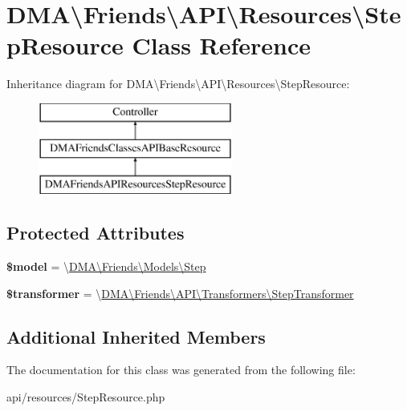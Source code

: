 \hypertarget{classDMA_1_1Friends_1_1API_1_1Resources_1_1StepResource}{}\section{D\+M\+A\textbackslash{}Friends\textbackslash{}A\+P\+I\textbackslash{}Resources\textbackslash{}Step\+Resource Class Reference}
\label{classDMA_1_1Friends_1_1API_1_1Resources_1_1StepResource}
Inheritance diagram for D\+M\+A\textbackslash{}Friends\textbackslash{}A\+P\+I\textbackslash{}Resources\textbackslash{}Step\+Resource\+:\begin{figure}[H]
\begin{center}
\leavevmode
\includegraphics[height=3.000000cm]{d5/de2/classDMA_1_1Friends_1_1API_1_1Resources_1_1StepResource}
\end{center}
\end{figure}
\subsection*{Protected Attributes}
\begin{DoxyCompactItemize}
\item 
\hypertarget{classDMA_1_1Friends_1_1API_1_1Resources_1_1StepResource_ac6cb8047bdd0625d5e9baee9b70d645a}{}{\bfseries \$model} = \textquotesingle{}\textbackslash{}\hyperlink{classDMA_1_1Friends_1_1Models_1_1Step}{D\+M\+A\textbackslash{}\+Friends\textbackslash{}\+Models\textbackslash{}\+Step}\textquotesingle{}\label{classDMA_1_1Friends_1_1API_1_1Resources_1_1StepResource_ac6cb8047bdd0625d5e9baee9b70d645a}

\item 
\hypertarget{classDMA_1_1Friends_1_1API_1_1Resources_1_1StepResource_aa3e321fd5b1eb2c32ada4b3532e50602}{}{\bfseries \$transformer} = \textquotesingle{}\textbackslash{}\hyperlink{classDMA_1_1Friends_1_1API_1_1Transformers_1_1StepTransformer}{D\+M\+A\textbackslash{}\+Friends\textbackslash{}\+A\+P\+I\textbackslash{}\+Transformers\textbackslash{}\+Step\+Transformer}\textquotesingle{}\label{classDMA_1_1Friends_1_1API_1_1Resources_1_1StepResource_aa3e321fd5b1eb2c32ada4b3532e50602}

\end{DoxyCompactItemize}
\subsection*{Additional Inherited Members}


The documentation for this class was generated from the following file\+:\begin{DoxyCompactItemize}
\item 
api/resources/Step\+Resource.\+php\end{DoxyCompactItemize}
